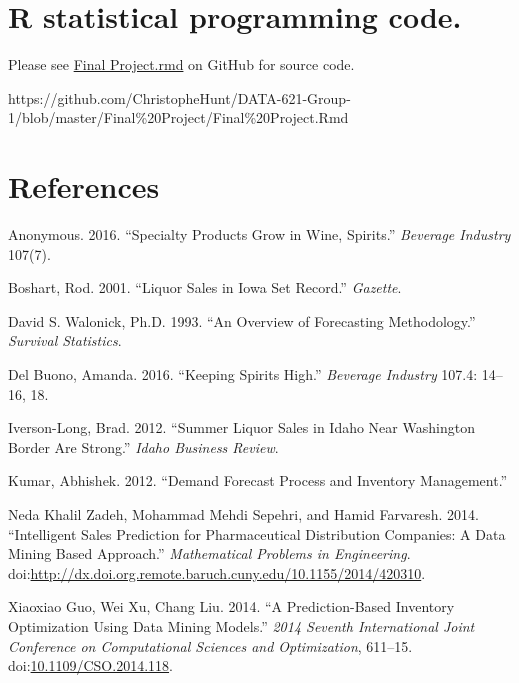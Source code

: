 \documentclass[]{elsarticle} %
\begin{document}
\section{R statistical programming
code.}\label{r-statistical-programming-code.}

Please see
\href{https://github.com/ChristopheHunt/DATA-621-Group-1/blob/master/Final\%20Project/Final\%20Project.Rmd}{Final
Project.rmd} on GitHub for source code.

https://github.com/ChristopheHunt/DATA-621-Group-1/blob/master/Final\%20Project/Final\%20Project.Rmd

\newpage

\section*{References}\label{references}

\hypertarget{refs}{}
\hypertarget{ref-SpecialityGrow3}{}
Anonymous. 2016. ``Specialty Products Grow in Wine, Spirits.''
\emph{Beverage Industry} 107(7).

\hypertarget{ref-IowaSetsRecord2}{}
Boshart, Rod. 2001. ``Liquor Sales in Iowa Set Record.'' \emph{Gazette}.

\hypertarget{ref-Forecast1}{}
David S. Walonick, Ph.D. 1993. ``An Overview of Forecasting
Methodology.'' \emph{Survival Statistics}.

\hypertarget{ref-KeepingSpiritsHigh1}{}
Del Buono, Amanda. 2016. ``Keeping Spirits High.'' \emph{Beverage
Industry} 107.4: 14--16, 18.

\hypertarget{ref-IdahoSales4}{}
Iverson-Long, Brad. 2012. ``Summer Liquor Sales in Idaho Near Washington
Border Are Strong.'' \emph{Idaho Business Review}.

\hypertarget{ref-Demand1}{}
Kumar, Abhishek. 2012. ``Demand Forecast Process and Inventory
Management.''

\hypertarget{ref-Pharma2}{}
Neda Khalil Zadeh, Mohammad Mehdi Sepehri, and Hamid Farvaresh. 2014.
``Intelligent Sales Prediction for Pharmaceutical Distribution
Companies: A Data Mining Based Approach.'' \emph{Mathematical Problems
in Engineering}.
doi:\href{https://doi.org/http://dx.doi.org.remote.baruch.cuny.edu/10.1155/2014/420310}{http://dx.doi.org.remote.baruch.cuny.edu/10.1155/2014/420310}.

\hypertarget{ref-DataMining1}{}
Xiaoxiao Guo, Wei Xu, Chang Liu. 2014. ``A Prediction-Based Inventory
Optimization Using Data Mining Models.'' \emph{2014 Seventh
International Joint Conference on Computational Sciences and
Optimization}, 611--15.
doi:\href{https://doi.org/10.1109/CSO.2014.118}{10.1109/CSO.2014.118}.
\end{document}
